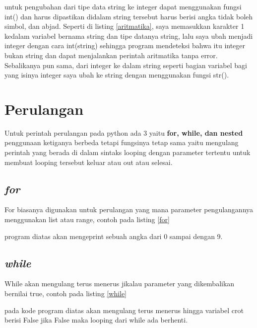 

untuk pengubahan dari tipe data string ke integer dapat menggunakan fungsi int() dan harus dipastikan didalam string tersebut harus berisi angka tidak boleh simbol, dan abjad. Seperti di listing \ref{aritmatika}, saya memasukkan karakter 1 kedalam variabel bernama string dan tipe datanya string, lalu saya ubah menjadi integer dengan cara int(string) sehingga program mendeteksi bahwa itu integer bukan string dan dapat menjalankan perintah aritmatika tanpa error. Sebalikanya pun sama, dari integer ke dalam string seperti bagian variabel bagi yang isinya integer saya ubah ke string dengan menggunakan fungsi str().

\section{Perulangan}
Untuk perintah perulangan pada python ada 3 yaitu \textbf{for, while, dan nested} penggunaan ketiganya berbeda tetapi fungsinya tetap sama yaitu mengulang perintah yang berada di dalam sintaks looping dengan parameter tertentu untuk membuat looping tersebut keluar atau out atau selesai.

\subsection{\textit{for}}
For biasanya digunakan untuk perulangan yang mana parameter pengulangannya menggunakan list atau range, contoh pada listing \ref{for}



program diatas akan mengeprint sebuah angka dari 0 sampai dengan 9.

\subsection{\textit{while}}
While akan mengulang terus menerus jikalau parameter yang dikembalikan bernilai true, contoh pada listing \ref{while}



pada kode program diatas akan mengulang terus menerus hingga variabel crot berisi False jika False maka looping dari while ada berhenti.

